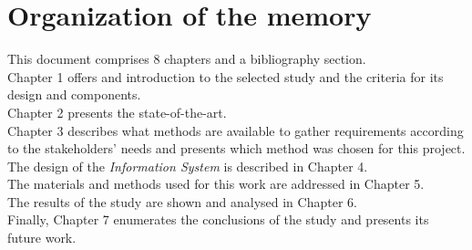 


\section{Organization of the memory}

This document comprises 8 chapters and a bibliography section.\\

Chapter 1 offers and introduction to the selected study and the criteria for its design and components.\\

Chapter 2 presents the state-of-the-art.\\

Chapter 3 describes what methods are available to gather requirements according to the stakeholders' needs and presents which method was chosen for this project.\\

The design of the \textit{Information System} \cite{noauthor_chapter_nodate, noauthor_information_2017} is described in Chapter 4.\\

The materials and methods used for this work are addressed in Chapter 5.\\

The results of the study are shown and analysed in Chapter 6.\\

Finally, Chapter 7 enumerates the conclusions of the study and presents its future work.\\

\newpage
\newpage
